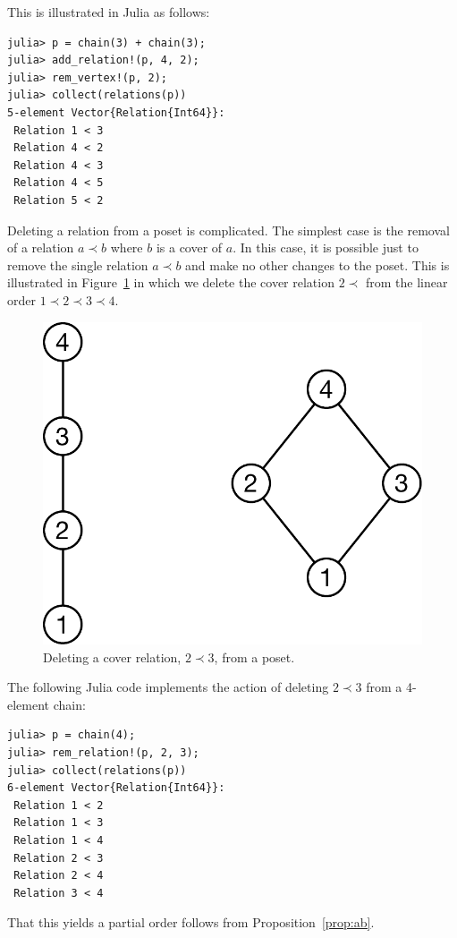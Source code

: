 \documentclass[12pt]{article}
\begin{document}
This is illustrated in Julia as follows:
\begin{verbatim}
julia> p = chain(3) + chain(3);
julia> add_relation!(p, 4, 2);
julia> rem_vertex!(p, 2);
julia> collect(relations(p))
5-element Vector{Relation{Int64}}:
 Relation 1 < 3
 Relation 4 < 2
 Relation 4 < 3
 Relation 4 < 5
 Relation 5 < 2
\end{verbatim}

\newpage
{}

Deleting a relation from a poset is complicated. The simplest case is
the removal of a relation $a \prec b$ where $b$ is a cover of $a$. In
this case, it is possible just to remove the single relation $a \prec
b$ and make no other changes to the poset. This is illustrated in
Figure~\ref{fig:cover-edge-deletion} in which we delete the cover
relation $2\prec$ from the linear order $1\prec2\prec3\prec4$. 
\begin{figure}[h]
  \begin{framed}
    \begin{center}
      \includegraphics[scale=0.3]{cover-edge-deletion}
    \end{center}
    \caption{Deleting a cover relation, $2\prec3$, from a poset.}
    \label{fig:cover-edge-deletion}
  \end{framed}
\end{figure}

The following Julia code implements the action of deleting $2 \prec 3$
from a 4-element chain:
\begin{verbatim}
julia> p = chain(4);
julia> rem_relation!(p, 2, 3);
julia> collect(relations(p))
6-element Vector{Relation{Int64}}:
 Relation 1 < 2
 Relation 1 < 3
 Relation 1 < 4
 Relation 2 < 3
 Relation 2 < 4
 Relation 3 < 4
\end{verbatim}
That this yields a partial order follows from
Proposition~\ref{prop:ab}. 
\end{document}
